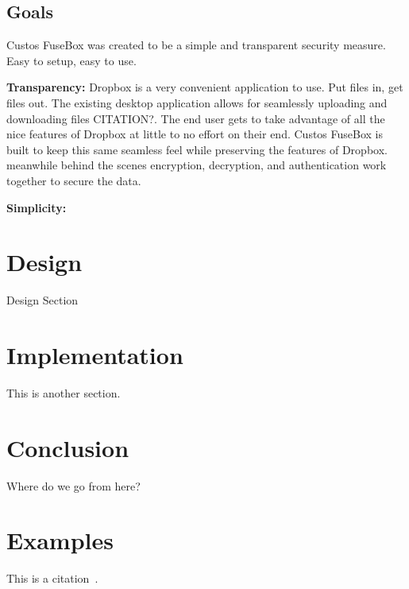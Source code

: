 \documentclass[11pt,twocolumn,letterpaper]{article}
\newcommand{\appname}{Custos FuseBox }
\begin{document}
\subsection{Goals}
\label{sec:goals}
\appname was created to be a simple and transparent security
measure. Easy to setup, easy to use.
\par {\bf Transparency:} Dropbox is a very convenient application to
use. Put files in, get files out. The existing desktop application
allows for seamlessly uploading and downloading files CITATION?. The end user
gets to take advantage of all the nice features of Dropbox at little
to no effort on their end. \appname is built to keep this same 
seamless feel while preserving the features of Dropbox. meanwhile behind the
scenes encryption, decryption, and authentication work together to
secure the data.     
\par {\bf Simplicity:} 

\section{Design}
\label{sec:design}

Design Section

\section{Implementation}
\label{sec:implementation}

This is another section.


\section{Conclusion}
\label{sec:conclusion}

Where do we go from here?

\section{Examples}
\label{sec:ex}

\noindent
This is a citation~\cite{exampleref1}.

\end{document}
